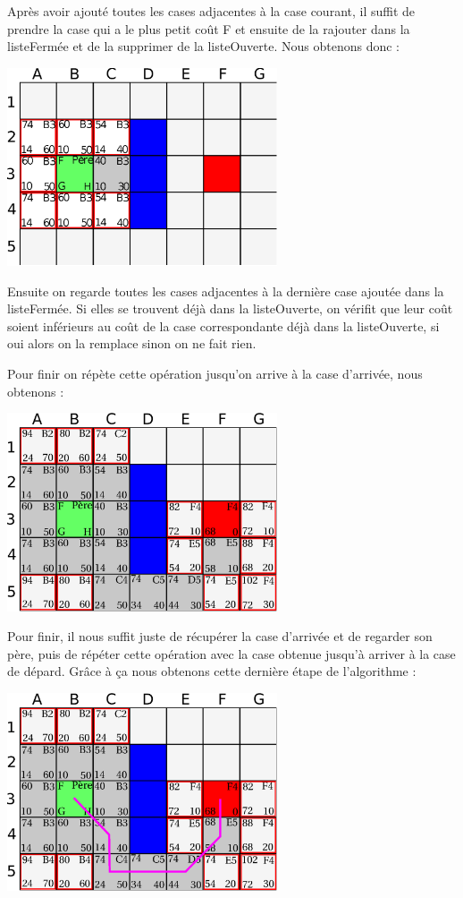 			Après avoir ajouté toutes les cases adjacentes à la case courant, il suffit de prendre la case qui a le plus petit coût F et ensuite de la rajouter dans la listeFermée et de la supprimer de la listeOuverte. Nous obtenons donc :
			\begin{center}
				\includegraphics[width=8cm]{./Analyse/Img/Grille4.eps}
			\end{center}
		
			Ensuite on regarde toutes les cases adjacentes à la dernière case ajoutée dans la listeFermée. Si elles se trouvent déjà dans la listeOuverte, on vérifit que leur coût soient inférieurs au coût de la case correspondante déjà dans la listeOuverte, si oui alors on la remplace sinon on ne fait rien.
		
			Pour finir on répète cette opération jusqu'on arrive à la case d'arrivée, nous obtenons :
			\begin{center}
				\includegraphics[width=8cm]{./Analyse/Img/Grille5.eps}
			\end{center}
		
			Pour finir, il nous suffit juste de récupérer la case d'arrivée et de regarder son père, puis de répéter cette opération avec la case obtenue jusqu'à arriver à la case de dépard. Grâce à ça nous obtenons cette dernière étape de l'algorithme :
			\begin{center}
				\includegraphics[width=8cm]{./Analyse/Img/Grille6.eps}
			\end{center}
		
